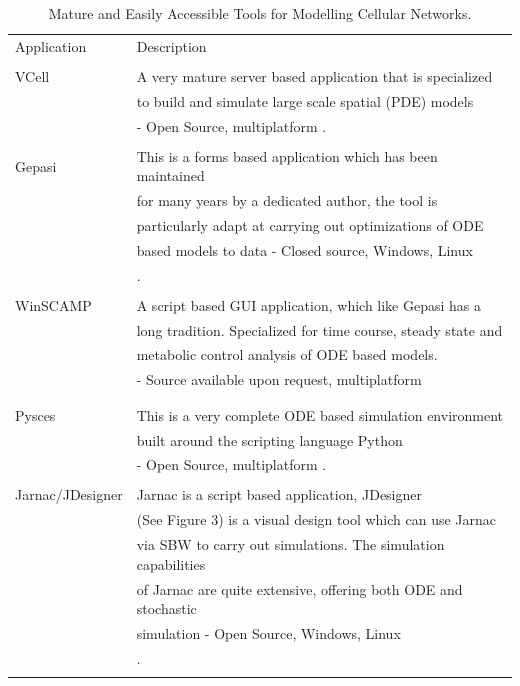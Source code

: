 \documentclass[12pt]{article}
\begin{document}
{\medskip
\begin{table}
\label{table:Apps}
\begin{tabular}{ll}
\rowcolor[gray]{0.8}\color{black}
Application & Description \\ \\
VCell  & A very mature server based application that is specialized \\
       & to build and simulate large scale spatial (PDE) models \\
       & - Open Source, multiplatform \cite{VCELL}. \\
       & \\
Gepasi & This is a forms based application which has been maintained \\
       & for many years by a dedicated author, the tool is \\
       & particularly adapt at carrying out optimizations of ODE \\
       & based models to data - Closed source, Windows, Linux \\
       & \cite{Gepasi:1993}. \\
       & \\
WinSCAMP & A script based GUI application, which like Gepasi has a \\
     & long tradition. Specialized for time course, steady state and \\
     & metabolic control analysis of ODE based models. \\
     & - Source available upon request, multiplatform \\
     & \cite{SauroF91,SauroScamp93} \\
     & \\
Pysces & This is a very complete ODE based simulation environment \\
       & built around the scripting language Python \\
       & - Open Source, multiplatform \cite{Pysces2005}. \\
       & \\
Jarnac/JDesigner & Jarnac is a script based application, JDesigner \\
      & (See Figure 3) is a visual design tool which can use Jarnac \\
      & via SBW to carry out simulations. The simulation capabilities \\
      & of Jarnac are quite extensive, offering both ODE and stochastic \\
      & simulation - Open Source, Windows, Linux \\
      & \cite{sauro:2000,Sauro:Omics}. \\
      & \\
\hline
\end{tabular}
\caption{Mature and Easily Accessible Tools for Modelling Cellular Networks.}
\end{table}

}
\end{document}
